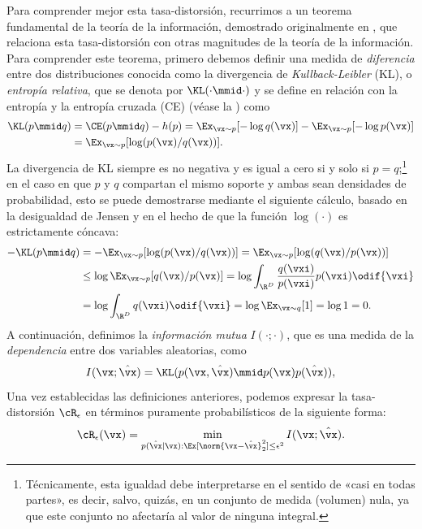 \documentclass[../../book-main.tex]{subfiles}
\begin{document}
Para comprender mejor esta tasa-distorsión, recurrimos a un teorema fundamental
de la teoría de la información, demostrado originalmente en
\textcite{shannon1959coding}, que relaciona esta tasa-distorsión con
otras magnitudes de la teoría de la información. Para comprender este teorema,
primero debemos definir una medida de \textit{diferencia} entre dos
distribuciones conocida como la divergencia de \textit{Kullback-Leibler} (KL),
o \textit{entropía relativa}, que se denota por \(\KL(\cdot \mmid
\cdot)\) y se define en relación con la entropía y la entropía cruzada (CE)
(véase la ) como
\begin{align}
    \KL(p \mmid q) &= \CE(p \mmid q) - h(p) = \Ex_{\vx \sim p}[-\log
    q(\vx)] - \Ex_{\vx \sim p}[-\log p(\vx)] \\
    &= \Ex_{\vx \sim p}[\log (p(\vx)/q(\vx))].
\end{align}
La divergencia de KL siempre es no negativa y es igual a cero si y solo
si \(p = q\);\footnote{Técnicamente, esta igualdad debe interpretarse
    en el sentido de «casi en todas partes», es decir, salvo, quizás, en un conjunto de medida
    (volumen) nula, ya que este conjunto no afectaría al valor de ninguna
integral.} en el caso en que \(p\) y \(q\) compartan el mismo soporte
y ambas sean densidades de probabilidad, esto se puede demostrarse mediante 
el siguiente cálculo, basado en la desigualdad de Jensen y en el hecho de que
la función \(\log(\cdot)\) es estrictamente cóncava:
\begin{align}
    - \KL(p\mmid q)
    &= -\Ex_{\vx \sim p}[\log(p(\vx)/q(\vx))] = \Ex_{\vx \sim
    p}[\log(q(\vx)/p(\vx))] \\
    &\leq \log \Ex_{\vx \sim p}[q(\vx)/p(\vx)] =  \log \int_{\R^{D}}
    \frac{q(\vxi)}{p(\vxi)}p(\vxi)\odif{\vxi} \\
    &= \log \int_{\R^{D}}q(\vxi)\odif{\vxi} = \log \Ex_{\vx \sim
    q}[1] = \log 1 = 0.
\end{align}
A continuación, definimos la \textit{información mutua} \(I(\cdot; \cdot)\),
que es una medida de la \textit{dependencia} entre dos variables aleatorias, como
\begin{equation}\label{eq:mutual-information}
    I(\vx; \hat{\vx})
    = \KL(p(\vx, \hat{\vx}) \mmid p(\vx) p(\hat{\vx})),
\end{equation}
Una vez establecidas las definiciones anteriores, podemos expresar la tasa-distorsión
\(\cR_{\epsilon}\) en términos puramente probabilísticos de la siguiente forma:
\begin{equation}
    \cR_{\epsilon}(\vx)
    = \min_{p(\hat \vx \mid \vx): \Ex[\norm{\vx -\hat \vx}_2^{2}] \le
    \epsilon^{2}}
    I(\vx; \hat{\vx}).
    \label{eqn:rate-distortion-general}
\end{equation}
\end{document}
